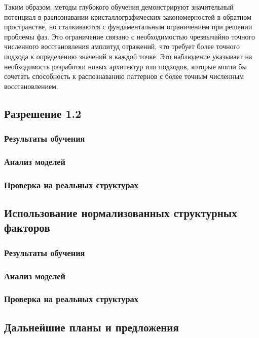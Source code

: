 Таким образом, методы глубокого обучения демонстрируют значительный потенциал в распознавании кристаллографических закономерностей в обратном пространстве, но сталкиваются с фундаментальным ограничением при решении проблемы фаз. Это ограничение связано с необходимостью чрезвычайно точного численного восстановления амплитуд отражений, что требует более точного подхода к определению значений в каждой точке. Это наблюдение указывает на необходимость разработки новых архитектур или подходов, которые могли бы сочетать способность к распознаванию паттернов с более точным численным восстановлением.

\subsection{Разрешение 1.2\angstrom}

\subsubsection{Результаты обучения}

\subsubsection{Анализ моделей}

\subsubsection{Проверка на реальных структурах}

\subsection{Использование нормализованных структурных факторов}

\subsubsection{Результаты обучения}

\subsubsection{Анализ моделей}

\subsubsection{Проверка на реальных структурах}

\subsection{Дальнейшие планы и предложения}

